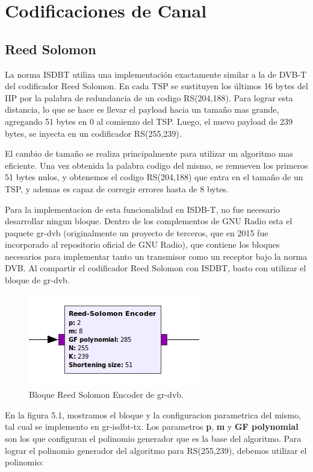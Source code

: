 \section{Codificaciones de Canal}

	\subsection{Reed Solomon}
La norma ISDBT utiliza una implementación exactamente similar a la de DVB-T del codificador Reed Solomon. En cada TSP se sustituyen los últimos 16 bytes del IIP por la palabra de redundancia de un codigo RS(204,188). Para lograr esta distancia, lo que se hace es llevar el payload hacia un tamaño mas grande, agregando 51 bytes en 0 al comienzo del TSP. Luego, el nuevo payload de 239 bytes, se inyecta en un codificador RS(255,239). 

El cambio de tamaño se realiza principalmente para utilizar un algoritmo mas eficiente. Una vez obtenida la palabra codigo del mismo, se remueven los primeros 51 bytes nulos, y obtenemos el codigo RS(204,188) que entra en el tamaño de un TSP, y ademas es capaz de corregir errores hasta de 8 bytes. 

Para la implementacion de esta funcionalidad en ISDB-T, no fue necesario desarrollar ningun bloque. Dentro de los complementos de GNU Radio esta el paquete gr-dvb \cite{gr-dvb} (originalmente un proyecto de terceros, que en 2015 fue incorporado al repositorio oficial de GNU Radio), que contiene los bloques necesarios para implementar tanto un transmisor como un receptor bajo la norma DVB. Al compartir el codificador Reed Solomon con ISDBT, basto con utilizar el bloque de gr-dvb.

\begin{figure}[h!]
	\centering
	\includegraphics[scale=0.5]{figuras/cap05/RSencoder}
	\caption{\label{f:RSencoder} Bloque Reed Solomon Encoder de gr-dvb.}
\end{figure}

En la figura 5.1, mostramos el bloque y la configuracion parametrica del mismo, tal cual se implemento en gr-isdbt-tx. Los parametros \textbf{p}, \textbf{m} y \textbf{GF polynomial} son los que configuran el polinomio generador que es la base del algoritmo. Para lograr el polinomio generador del algoritmo para RS(255,239), debemos utilizar el polinomio:

